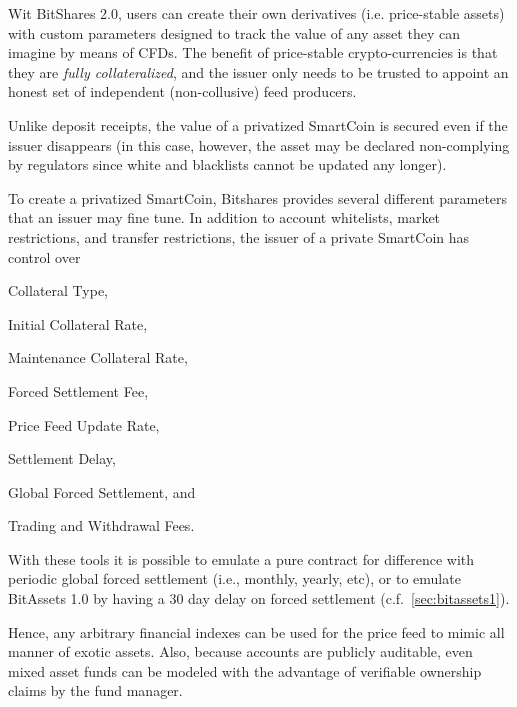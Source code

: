 \label{sec:uia:priv}

Wit BitShares 2.0, users can create their own derivatives (i.e. price-stable
assets) with custom parameters designed to track the value of any
asset they can imagine by means of CFDs. The benefit of price-stable
crypto-currencies is that they are \emph{fully collateralized}, and the issuer
only needs to be trusted to appoint an honest set of independent
(non-collusive) feed producers. 

Unlike deposit receipts, the value of a privatized SmartCoin is secured even if
the issuer disappears (in this case, however, the asset may be declared
non-complying by regulators since white and blacklists cannot be updated any
longer).

To create a privatized SmartCoin, Bitshares provides several different
parameters that an issuer may fine tune. In addition to account whitelists,
market restrictions, and transfer restrictions, the issuer of a private
SmartCoin has control over
\begin{inparaenum}[(a)]
 \item Collateral Type,
 \item Initial Collateral Rate,
 \item Maintenance Collateral Rate,
 \item Forced Settlement Fee, 
 \item Price Feed Update Rate,
 \item Settlement Delay, %
 \item Global Forced Settlement, and
 \item Trading and Withdrawal Fees.
\end{inparaenum}

With these tools it is possible to emulate a pure contract for difference with
periodic global forced settlement (i.e., monthly, yearly, etc), or to emulate
BitAssets 1.0 by having a 30 day delay on forced settlement
(c.f.~\cref{sec:bitassets1}).

Hence, any arbitrary financial indexes can be used for the price feed to mimic
all manner of exotic assets. Also, because accounts are publicly auditable,
even mixed asset funds can be modeled with the advantage of verifiable
ownership claims by the fund manager.
